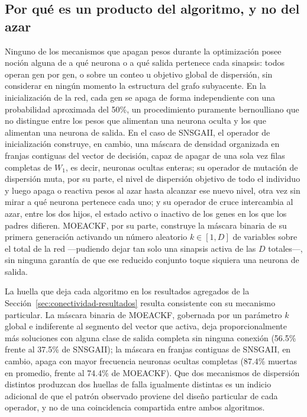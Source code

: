 \subsection{Por qué es un producto del algoritmo, y no del azar}
\label{sec:conectividad-mecanismos}

Ninguno de los mecanismos que apagan pesos durante la optimización posee noción alguna de a qué neurona o a qué salida pertenece cada sinapsis: todos operan gen por gen, o sobre un conteo u objetivo global de dispersión, sin considerar en ningún momento la estructura del grafo subyacente. En la inicialización de la red, cada gen se apaga de forma independiente con una probabilidad aproximada del 50\%, un procedimiento puramente bernoulliano que no distingue entre los pesos que alimentan una neurona oculta y los que alimentan una neurona de salida. En el caso de SNSGAII, el operador de inicialización construye, en cambio, una máscara de densidad organizada en franjas contiguas del vector de decisión, capaz de apagar de una sola vez filas completas de $W_1$, es decir, neuronas ocultas enteras; su operador de mutación de dispersión muta, por su parte, el nivel de dispersión objetivo de todo el individuo y luego apaga o reactiva pesos al azar hasta alcanzar ese nuevo nivel, otra vez sin mirar a qué neurona pertenece cada uno; y su operador de cruce intercambia al azar, entre los dos hijos, el estado activo o inactivo de los genes en los que los padres difieren. MOEACKF, por su parte, construye la máscara binaria de su primera generación activando un número aleatorio $k \in [1, D]$ de variables sobre el total de la red —pudiendo dejar tan solo una sinapsis activa de las $D$ totales—, sin ninguna garantía de que ese reducido conjunto toque siquiera una neurona de salida.

La huella que deja cada algoritmo en los resultados agregados de la Sección~\ref{sec:conectividad-resultados} resulta consistente con su mecanismo particular. La máscara binaria de MOEACKF, gobernada por un parámetro $k$ global e indiferente al segmento del vector que activa, deja proporcionalmente más soluciones con alguna clase de salida completa sin ninguna conexión (56.5\% frente al 37.5\% de SNSGAII); la máscara en franjas contiguas de SNSGAII, en cambio, apaga con mayor frecuencia neuronas ocultas completas (87.4\% muertas en promedio, frente al 74.4\% de MOEACKF). Que dos mecanismos de dispersión distintos produzcan dos huellas de falla igualmente distintas es un indicio adicional de que el patrón observado proviene del diseño particular de cada operador, y no de una coincidencia compartida entre ambos algoritmos.

